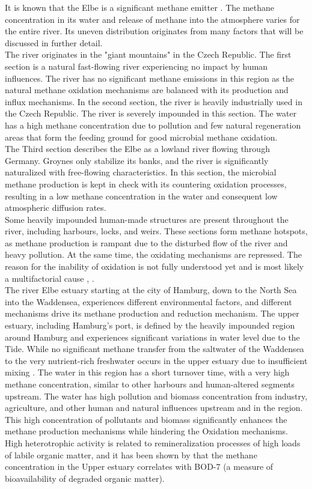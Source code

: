 It is known that the Elbe is a significant methane emitter \cite{Matousu.2019}. The methane concentration in its water and release of methane into the atmosphere varies for the entire river. Its uneven distribution originates from many factors that will be discussed in further detail.\\
The river originates in the "giant mountains" in the Czech Republic. The first section is a natural fast-flowing river experiencing no impact by human influences. The river has no significant methane emissions in this region as the natural methane oxidation mechanisms are balanced with its production and influx mechanisms. In the second section, the river is heavily industrially used in the Czech Republic. The river is severely impounded in this section. The water has a high methane concentration due to pollution and few natural regeneration areas that form the feeding ground for good microbial methane oxidation. \\
The Third section describes the Elbe as a lowland river flowing through Germany. Groynes only stabilize its banks, and the river is significantly naturalized with free-flowing characteristics. In this section, the microbial methane production is kept in check with its countering oxidation processes, resulting in a low methane concentration in the water and consequent low atmospheric diffusion rates.\\
Some heavily impounded human-made structures are present throughout the river, including harbours, locks, and weirs. These sections form methane hotspots, as methane production is rampant due to the disturbed flow of the river and heavy pollution. At the same time, the oxidating mechanisms are repressed. The reason for the inability of oxidation is not fully understood yet and is most likely a multifactorial cause \cite{Matousu.2019}, \cite{Bednarik.2019}.\\
The river Elbe estuary starting at the city of Hamburg, down to the North Sea into the Waddensea, experiences different environmental factors, and different mechanisms drive its methane production and reduction mechanism. The upper estuary, including Hamburg's port, is defined by the heavily impounded region around Hamburg and experiences significant variations in water level due to the Tide. While no significant methane transfer from the saltwater of the Waddensea to the very nutrient-rich freshwater occurs in the upper estuary due to insufficient mixing \cite{Matousu.2019}. The water in this region has a short turnover time, with a very high methane concentration, similar to other harbours and human-altered segments upstream. The water has high pollution and biomass concentration from industry, agriculture, and other human and natural influences upstream and in the region. This high concentration of pollutants and biomass significantly enhances the methane production mechanisms while hindering the Oxidation mechanisms. High heterotrophic activity is related to remineralization processes of high loads of labile organic matter, and it has been shown by \cite{Matousu.2019} that the methane concentration in the Upper estuary correlates with BOD-7 (a measure of bioavailability of degraded organic matter). \\

